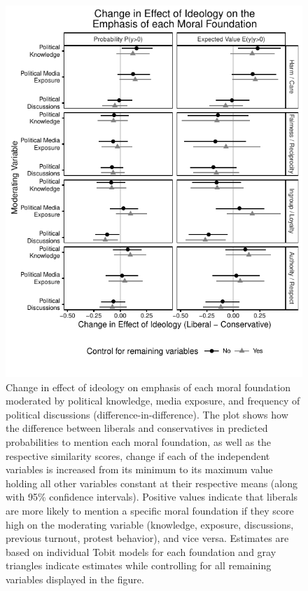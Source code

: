 \documentclass[12pt]{article}
\begin{document}
\begin{figure}[ht]\centering
\includegraphics[scale=.8]{../calc/fig/tobit_ideol_difdif.pdf}
\caption{Change in effect of ideology on emphasis of each moral foundation moderated by political knowledge, media exposure, and frequency of political discussions (difference-in-difference). The plot shows how the difference between liberals and conservatives in predicted probabilities to mention each moral foundation, as well as the respective similarity scores, change if each of the independent variables is increased from its minimum to its maximum value holding all other variables constant at their respective means (along with 95\% confidence intervals). Positive values indicate that liberals are more likely to mention a specific moral foundation if they score high on the moderating variable (knowledge, exposure, discussions, previous turnout, protest behavior), and vice versa. Estimates are based on individual Tobit models for each foundation and gray triangles indicate estimates while controlling for all remaining variables displayed in the figure. %
}\label{fig:tobit_ideol_difdif}
\end{figure}
\end{document}
